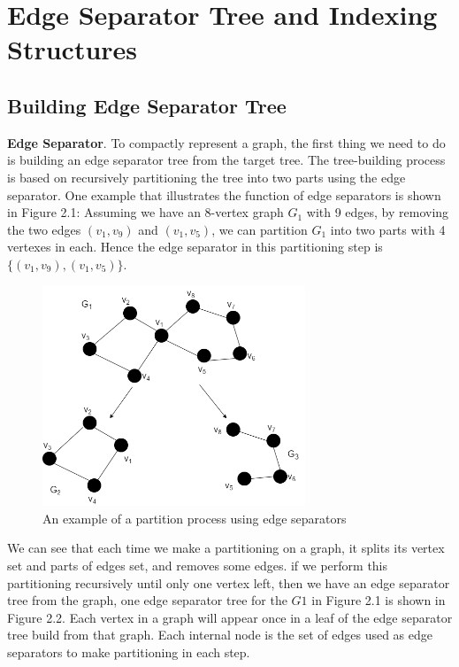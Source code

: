 \documentclass[12pt,glossary]{dalthesis}
\begin{document}
\chapter{Edge Separator Tree and Indexing Structures}


\section{Building Edge Separator Tree}

\textbf{Edge Separator}. To compactly represent a graph, the first thing we need to do is building an edge separator tree from the target tree. The tree-building process is based on recursively partitioning the tree into two parts using the edge separator. One example that illustrates the function of edge separators is shown in Figure 2.1: Assuming we have an 8-vertex graph $G_{1}$ with 9 edges, by removing the two edges $(v_{1}, v_{9})$ and $(v_{1}, v_{5})$, we can partition $G_{1}$ into two parts with 4 vertexes in each. Hence the edge separator in this partitioning step is $\{(v_{1}, v_{9}),(v_{1}, v_{5}) \}$.

\bigskip

\begin{figure}[ht]
\centering
\includegraphics[width=0.7\textwidth]{partition}
\caption{An example of a partition process using edge separators}
\end{figure}

\bigskip

We can see that each time we make a partitioning on a graph, it splits its vertex set and parts of edges set, and removes some edges. if we perform this partitioning recursively until only one vertex left, then we have an edge separator tree from the graph, one edge separator tree for the $G1$ in Figure 2.1 is shown in Figure 2.2. Each vertex in a graph will appear once in a leaf of the edge separator tree build from that graph. Each internal node is the set of edges used as edge separators to make partitioning in each step.
\end{document}
